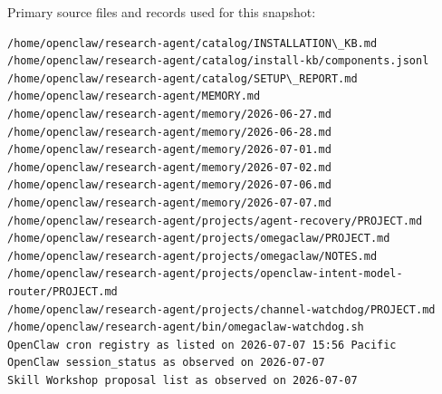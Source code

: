 \documentclass[11pt]{article}
\begin{document}
Primary source files and records used for this snapshot:
\begin{verbatim}
/home/openclaw/research-agent/catalog/INSTALLATION\_KB.md
/home/openclaw/research-agent/catalog/install-kb/components.jsonl
/home/openclaw/research-agent/catalog/SETUP\_REPORT.md
/home/openclaw/research-agent/MEMORY.md
/home/openclaw/research-agent/memory/2026-06-27.md
/home/openclaw/research-agent/memory/2026-06-28.md
/home/openclaw/research-agent/memory/2026-07-01.md
/home/openclaw/research-agent/memory/2026-07-02.md
/home/openclaw/research-agent/memory/2026-07-06.md
/home/openclaw/research-agent/memory/2026-07-07.md
/home/openclaw/research-agent/projects/agent-recovery/PROJECT.md
/home/openclaw/research-agent/projects/omegaclaw/PROJECT.md
/home/openclaw/research-agent/projects/omegaclaw/NOTES.md
/home/openclaw/research-agent/projects/openclaw-intent-model-router/PROJECT.md
/home/openclaw/research-agent/projects/channel-watchdog/PROJECT.md
/home/openclaw/research-agent/bin/omegaclaw-watchdog.sh
OpenClaw cron registry as listed on 2026-07-07 15:56 Pacific
OpenClaw session_status as observed on 2026-07-07
Skill Workshop proposal list as observed on 2026-07-07
\end{verbatim}
\end{document}
